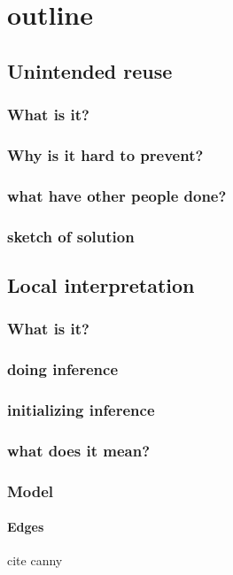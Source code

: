 \documentclass{tufte-book}
\begin{document}
\frontmatter
\mainmatter

\chapter{outline}

\section{Unintended reuse}
  \subsection{What is it?}
  \subsection{Why is it hard to prevent?}
  \subsection{what have other people done?}
  \subsection{sketch of solution}

\section{Local interpretation}
  \subsection{What is it?}
  \subsection{doing inference}
  \subsection{initializing inference}
  \subsection{what does it mean?}

  \subsection{Model}
    \subsubsection{Edges}
      cite canny
\end{document}
